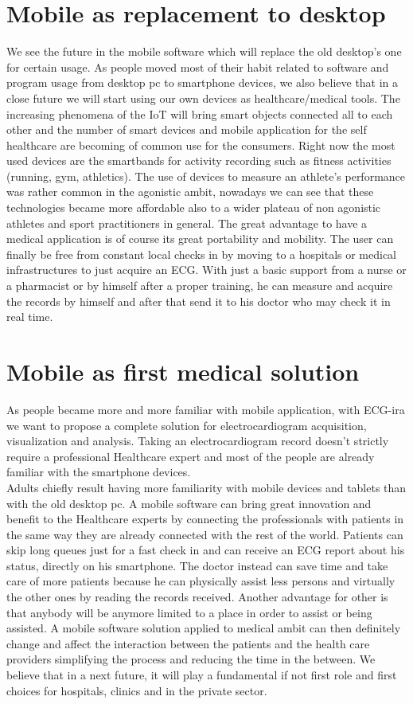 \section{Mobile as replacement to desktop}
We see the future in the mobile software which will replace the old desktop’s one for certain usage. As people moved most of their habit related to software and program usage from desktop pc to smartphone devices, we also believe that in a close future we will start using our own devices as healthcare/medical tools. The increasing phenomena of the IoT will bring smart objects connected all to each other and the number of smart devices and mobile application for the self healthcare are becoming of common use for the consumers. Right now the most used devices are the smartbands for activity recording such as fitness activities (running, gym, athletics). The use of devices to measure an athlete's performance was rather common in the agonistic ambit, nowadays we can see that these technologies became more affordable also to a wider plateau of non agonistic athletes and sport practitioners in general. The great advantage to have a medical application is of course its great portability and mobility. The user can finally be free from constant local checks in by moving to a hospitals or medical infrastructures to just acquire an ECG. With just a basic support from a nurse or a pharmacist or by himself after a proper training, he can measure and acquire the records by himself and after that send it to his doctor who may check it in real time.

\section{Mobile as first medical solution}
As people became more and more familiar with mobile application, with ECG-ira we want to propose a complete solution for electrocardiogram acquisition, visualization and analysis. Taking an electrocardiogram record doesn’t  strictly require a professional Healthcare expert and most of the people are already familiar with the smartphone devices.\\
Adults chiefly result having more familiarity with mobile devices and tablets than with the old desktop pc. A mobile software can bring great innovation and benefit to the Healthcare experts by connecting the professionals with patients in the same way they are already connected with the rest of the world. Patients can skip long queues just for a fast check in and can receive an ECG report about his status, directly on his smartphone. The doctor instead can save time and take care of more patients because he can physically assist less persons and virtually the other ones by reading the records received. Another advantage for other is that anybody will be anymore limited to a place in order to assist or being assisted. A mobile software solution applied to medical ambit can then definitely change  and affect the interaction between the patients and the health care providers simplifying the process and reducing the time in the between. We believe that in a next future, it will play a fundamental if not first role and first choices for hospitals,  clinics and in the private sector.